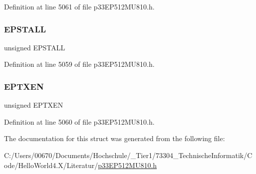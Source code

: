 Definition at line 5061 of file p33\+E\+P512\+M\+U810.\+h.

\mbox{\label{structtag_u1_e_p3_b_i_t_s_a47042104f04ebe06a23f9789bd400d7e}} 
\subsubsection{\texorpdfstring{E\+P\+S\+T\+A\+LL}{EPSTALL}}
{\footnotesize\ttfamily unsigned E\+P\+S\+T\+A\+LL}



Definition at line 5059 of file p33\+E\+P512\+M\+U810.\+h.

\mbox{\label{structtag_u1_e_p3_b_i_t_s_aa2d88c1be513e759c136823c86a355b4}} 
\subsubsection{\texorpdfstring{E\+P\+T\+X\+EN}{EPTXEN}}
{\footnotesize\ttfamily unsigned E\+P\+T\+X\+EN}



Definition at line 5060 of file p33\+E\+P512\+M\+U810.\+h.



The documentation for this struct was generated from the following file\+:\begin{DoxyCompactItemize}
\item 
C\+:/\+Users/00670/\+Documents/\+Hochschule/\+\_\+\+Tier1/73304\+\_\+\+Technische\+Informatik/\+Code/\+Hello\+World4.\+X/\+Literatur/\hyperlink{p33_e_p512_m_u810_8h}{p33\+E\+P512\+M\+U810.\+h}\end{DoxyCompactItemize}
